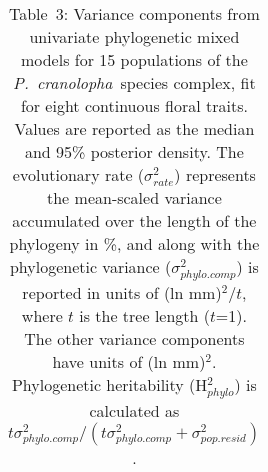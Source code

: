 \documentclass[12pt,letterpaper]{article}
\def\PC{\emph{P.~cranolopha}}
\begin{document}
\begin{table}
\caption*{Table~3: Variance components from univariate phylogenetic mixed models for 15 populations of the \PC~species complex, fit for eight continuous floral traits. Values are reported as the median and 95\% posterior density. The evolutionary rate ($\sigma^2_{rate}$) represents the mean-scaled variance accumulated over the length of the phylogeny in \%, and along with the phylogenetic variance ($\sigma^2_{phylo.comp}$) is reported in units of (ln mm)$^2$/$t$, where $t$ is the tree length ($t$=1). The other variance components have units of (ln mm)$^2$. Phylogenetic heritability (H$^2_{phylo}$) is calculated as $t\sigma^2_{phylo.comp}/(t\sigma^2_{phylo.comp} + \sigma^2_{pop.resid})$.}
\centering
\footnotesize
\begin{tabular}{lcccccc}
\hline


\end{tabular}
\end{table}
\end{document}
